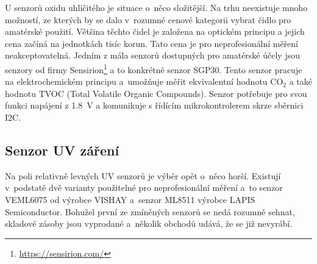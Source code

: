 U senzorů oxidu uhličitého je situace o~něco složitější. Na trhu neexistuje mnoho možností, ze kterých by se dalo v~rozumné cenové kategorii vybrat čidlo pro amatérské použití. Většina těchto čidel je založena na optickém principu a jejich cena začíná na jednotkách tisíc korun. Tato cena je pro neprofesionální měření neakceptovatelná. Jedním z mála senzorů dostupných pro amatérské účely jsou senzory od firmy Sensirion\footnote{\url{https://sensirion.com/}} a to konkrétně senzor SGP30. Tento senzor pracuje na elektrochemickém principu a~umožňuje měřit ekvivalentní hodnotu CO$_2$ a také hodnotu TVOC (Total Volatile Organic Compounds). Senzor potřebuje pro svou funkci napájení z \SI{1.8}{\volt} a komunikuje s řídícím mikrokontrolerem skrze sběrnici I2C.



\subsection{Senzor UV záření}

Na poli relativně levných UV senzorů je výběr opět o~něco horší. Existují v~podstatě dvě varianty použitelné pro neprofesionální měření a~to senzor VEML6075 od výrobce VISHAY a~senzor ML8511 výrobce LAPIS Semiconductor. Bohužel první ze zmíněných senzorů se nedá rozumně sehnat, skladové zásoby jsou vyprodané a~několik obchodů udává, že se již nevyrábí.

